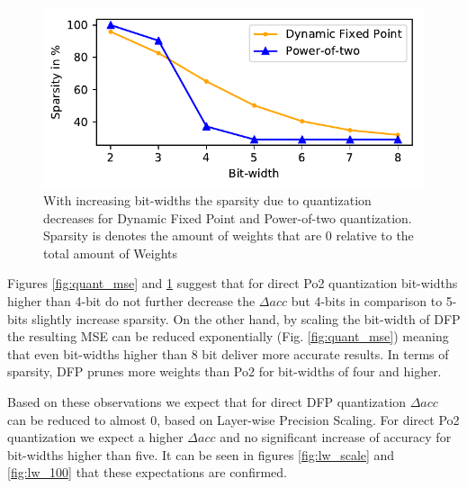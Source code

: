 \begin{figure}[t]
\includegraphics[width=\columnwidth]{img/sparse.pdf}
\caption{With increasing bit-widths the sparsity due to quantization decreases for Dynamic Fixed Point and Power-of-two quantization. Sparsity is denotes the amount of weights that are 0 relative to the total amount of Weights}\label{fig:quant_sparse}
\end{figure}

Figures \ref{fig:quant_mse} and \ref{fig:quant_sparse} suggest that for direct Po2 quantization bit-widths higher than 4-bit do not further decrease the $\Delta acc$ but 4-bits in comparison to 5-bits slightly increase sparsity. 
On the other hand, by scaling the bit-width of DFP the resulting MSE can be reduced exponentially (Fig. \ref{fig:quant_mse}) meaning that even bit-widths higher than 8 bit deliver more accurate results. In terms of sparsity, DFP prunes more weights than Po2 for bit-widths of four and higher.

Based on these observations we expect that for direct DFP quantization $\Delta acc$ can be reduced to almost 0, based on Layer-wise Precision Scaling. For direct Po2 quantization we expect a higher $\Delta acc$ and no significant increase of accuracy for bit-widths higher than five. It can be seen in figures \ref{fig:lw_scale} and \ref{fig:lw_100} that these expectations are confirmed.


